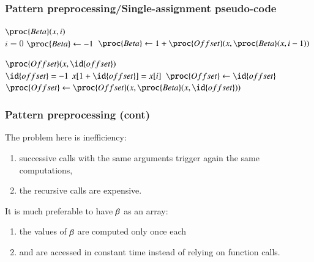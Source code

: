 %
\begin{frame}
\frametitle{Pattern preprocessing/Single-assignment pseudo-code}

\begin{codebox}
\(\proc{Beta} (x, i)\)\\
\li \If \(i = 0\)
\li \Then \(\proc{Beta} \gets -1\)
\li \Else \(\proc{Beta} \gets 1 + \proc{Offset} (x, \proc{Beta} (x,i-1))\)
    \End
\end{codebox}
\begin{codebox}
\(\proc{Offset}(x,\id{offset})\)\\
\li \If \(\id{offset} = -1\) \LogOr \(x[1+\id{offset}] = x[i]\)
\li \Then \(\proc{Offset} \gets \id{offset}\)
\li \Else \(\proc{Offset} \gets \proc{Offset} (x, \proc{Beta} (x,
            \id{offset}))\)
    \End
\end{codebox}

\end{frame}

%
\begin{frame}
\frametitle{Pattern preprocessing (cont)}

The problem here is inefficiency:
\begin{enumerate}

  \item successive calls with the same arguments trigger again the
    same computations,

  \item the recursive calls are expensive.

\end{enumerate}
It is much preferable to have \(\beta\) as an array:
\begin{enumerate}

  \item the values of \(\beta\) are computed only once each

  \item and are accessed in constant time instead of relying on
    function calls.

\end{enumerate}

\end{frame}

